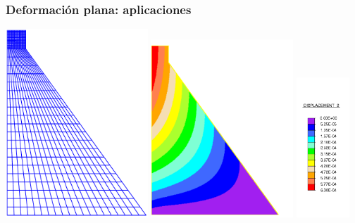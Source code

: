 \documentclass[handout]{beamer}
\begin{document}
\begin{frame}
\frametitle{Deformación plana: aplicaciones}
\begin{center}
\includegraphics[width=0.40\textwidth]{dam2dm}
\hfill
\includegraphics[width=0.40\textwidth]{dam2dc1}
\includegraphics[width=0.15\textwidth]{dam2dc2}
\end{center}
\end{frame}
\end{document}
